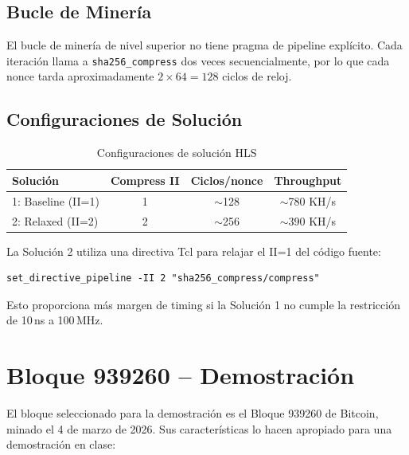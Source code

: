 \documentclass[12pt,a4paper]{article}
\begin{document}
\subsection{Bucle de Miner\'ia}

El bucle de miner\'ia de nivel superior no tiene pragma de pipeline expl\'icito.
Cada iteraci\'on llama a \texttt{sha256\_compress} dos veces secuencialmente,
por lo que cada nonce tarda aproximadamente $2 \times 64 = 128$ ciclos de reloj.

\subsection{Configuraciones de Soluci\'on}

\begin{table}[h]
    \centering
    \caption{Configuraciones de soluci\'on HLS}
    \begin{tabular}{@{}lccc@{}}
        \toprule
        \textbf{Soluci\'on} & \textbf{Compress II} & \textbf{Ciclos/nonce} & \textbf{Throughput} \\
        \midrule
        1: Baseline (II=1) & 1 & $\sim$128 & $\sim$780 KH/s \\
        2: Relaxed (II=2)  & 2 & $\sim$256 & $\sim$390 KH/s \\
        \bottomrule
    \end{tabular}
\end{table}

La Soluci\'on 2 utiliza una directiva Tcl para relajar el II=1 del c\'odigo fuente:

\begin{lstlisting}[style=tclstyle]
set_directive_pipeline -II 2 "sha256_compress/compress"
\end{lstlisting}

Esto proporciona m\'as margen de timing si la Soluci\'on 1 no cumple la restricci\'on
de 10\,ns a 100\,MHz.

\section{Bloque 939260 -- Demostraci\'on}

El bloque seleccionado para la demostraci\'on es el Bloque 939260 de Bitcoin,
minado el 4 de marzo de 2026. Sus caracter\'isticas lo hacen apropiado para
una demostraci\'on en clase:
\end{document}
